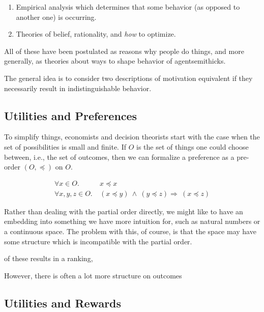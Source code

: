 \documentclass{book}
\begin{document}
	\begin{enumerate}
		\item Empirical analysis which determines that some behavior (as opposed to another one) is occurring. 
		\item Theories of belief, rationality, and \emph{how} to optimize.
	\end{enumerate}
	
	
	
	All of these have been postulated as reasons why people do things, and more generally, as theories about ways to shape behavior of agentsemithicks. 
	
	
	
	The general idea is to consider two descriptions of motivation equivalent if they necessarily result in indistinguishable behavior. 
	
	
	\subsection{Utilities and Preferences}
	
	To simplify things, economists and decision theorists start with the case when the set of possibilities is small and finite. If $O$ is the set of things one could choose between, i.e., the set of outcomes, then we can formalize a preference as a pre-order $(O, \preccurlyeq)$ on $O$.
	
	\begin{align*}
		\forall x \in O.&~x \preccurlyeq x \tag{Reflexivity}\\
		\forall x,y,z \in O.&~(x\preccurlyeq y)~\land~( y \preccurlyeq z) \Rightarrow~(x \preccurlyeq z) \tag{Transitivity}
	\end{align*}
	
	Rather than dealing with the partial order directly, we might like to have an embedding into something we have more intuition for, such as natural numbers or a continuous space. The problem with this, of course, is that the space may have some structure which is incompatible with the partial order. 
	
	of these results in a ranking, 
	
	However, there is often a lot more structure on outcomes
	
	
	

	
	\subsection{Utilities and Rewards}
	
\end{document}
